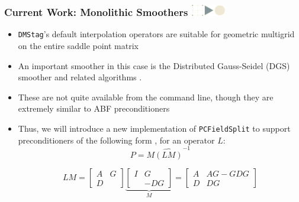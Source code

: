 \documentclass{beamer}
\newcommand{\mattwo}[4]{\left[ \begin{array}{cc}  #1 & #2 \\ #3 & #4 \end{array} \right]}
\newcommand\frametitlelogo[1]{\frametitle{#1\hspace{0pt plus 1 filll} \includegraphics[width=42pt]{logo_slides}}}
\begin{document}
\begin{frame}[fragile]
  \frametitlelogo{Current Work: Monolithic Smoothers}
  \begin{itemize}
  \item \texttt{DMStag}'s default interpolation operators are suitable for geometric multigrid on the entire saddle point matrix
  \item An important smoother in this case is the Distributed Gauss-Seidel (DGS) smoother  and related algorithms .
    \item These are not quite available from the command line, though they are extremely similar to ABF preconditioners
  \item Thus, we will introduce a new implementation of \texttt{PCFieldSplit} to support preconditioners of the following form , for an operator $L$:
    $$
      P = M\hat{(LM)}^{-1}
      $$

      \begin{equation*} \label{eq:LM}
  LM =  \mattwo{A}{G}{D}{} \underbrace{\mattwo{I}{G}{}{-DG}}_M = \mattwo{A}{AG-GDG}{D}{DG}
\end{equation*}

  \end{itemize}
\end{frame}

\end{document}

